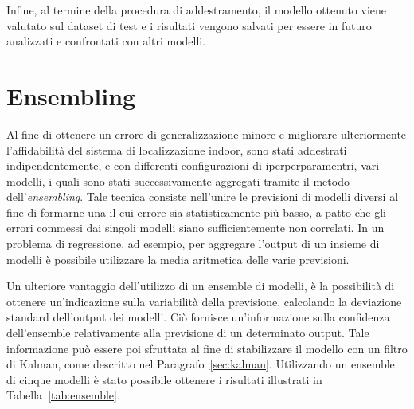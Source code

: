 Infine, al termine della procedura di addestramento, il modello ottenuto viene
valutato sul dataset di test e i risultati vengono salvati per essere in futuro
analizzati e confrontati con altri modelli.
\section{Ensembling}\label{sec:ensemble}
Al fine di ottenere un errore di generalizzazione minore e migliorare
ulteriormente l'affidabilità del sistema di localizzazione indoor, sono stati
addestrati indipendentemente, e con differenti configurazioni di
iperperparamentri, vari modelli, i quali sono stati successivamente aggregati
tramite il metodo dell'\emph{ensembling}. Tale tecnica consiste nell'unire le
previsioni di modelli diversi al fine di formarne una il cui errore sia
statisticamente più basso, a patto che gli errori commessi dai singoli modelli
siano sufficientemente non correlati\cite{goodfellow}. In un problema di
regressione, ad esempio, per aggregare l'output di un insieme di modelli è
possibile utilizzare la media aritmetica delle varie previsioni.

Un ulteriore vantaggio dell'utilizzo di un ensemble di modelli, è la
possibilità di ottenere un'indicazione sulla variabilità della previsione,
calcolando la deviazione standard dell'output dei modelli. Ciò fornisce
un'informazione sulla confidenza dell'ensemble relativamente alla previsione di
un determinato output. Tale informazione può essere poi sfruttata al fine di
stabilizzare il modello con un filtro di Kalman, come descritto nel
Paragrafo~\ref{sec:kalman}. Utilizzando un ensemble di cinque modelli è stato
possibile ottenere i risultati illustrati in Tabella~\ref{tab:ensemble}.



